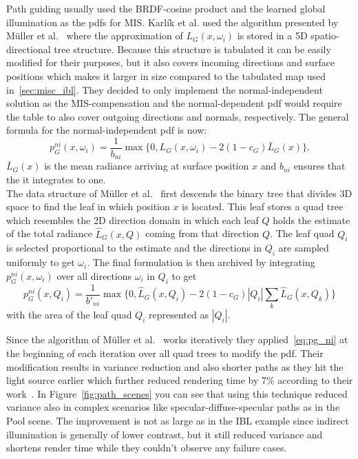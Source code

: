 Path guiding usually used the BRDF-cosine product and the learned global illumination as the pdfs for MIS.
Karl\'ik et al. used the algorithm presented by M\"uller et al.~\cite{mueller2017}
where the approximation of $ L_G(x, \omega_i) $ is stored in a 5D spatio-directional tree structure.
Because this structure is tabulated it can be easily modified for their purposes,
but it also covers incoming directions and surface positions which makes it larger in size compared to the tabulated map used in~\ref{sec:misc_ibl}.
They decided to only implement the normal-independent solution
as the MIS-compensation and the normal-dependent pdf would require the table to also cover outgoing directions and normals, respectively.
The general formula for the normal-independent pdf is now:
$$ p_G^{ni}(x, \omega_i) = \frac{1}{b_{ni}} \max \{ 0, L_G(x, \omega_i) - 2 (1 - c_G) \bar{L}_G(x) \}. $$
$ \bar{L}_G(x) $ is the mean radiance arriving at surface position $ x $ and $ b_{ni} $ ensures that the it integrates to one.\\
The data structure of M\"uller et al.~\cite{mueller2017} first descends the binary tree that divides 3D space to find the leaf in which position $ x $ is located.
This leaf stores a quad tree which resembles the 2D direction domain in which each leaf $ Q $ holds the estimate of the total radiance $ \hat{L}_G(x, Q) $ coming from that direction $ Q $.
The leaf quad $ Q_i $ is selected proportional to the estimate and the directions in $ Q_i $ are sampled uniformly to get $ \omega_i $.
The final formulation is then archived by integrating $ p_G^{ni}(x, \omega_i) $ over all directions $ \omega_i $ in $ Q_i $ to get
\begin{equation}
    \label{eq:pg_ni}
    p_G^{ni}(x, Q_i) = \frac{1}{b'_{ni}} \max \{ 0, \hat{L}_G(x, Q_i) - 2 (1 - c_G) |Q_i| \sum_k \hat{L}_G(x, Q_k) \}
\end{equation}
with the area of the leaf quad $ Q_i $ represented as $ |Q_i| $.

Since the algorithm of M\"uller et al.~\cite{mueller2017} works iteratively they applied~\ref{eq:pg_ni} at the beginning of each iteration over all quad trees to modify the pdf.
Their modification results in variance reduction and also shorter paths
as they hit the light source earlier which further reduced rendering time by 7\% according to their work~\cite[Section~9]{Karlik2019}.
In Figure~\ref{fig:path_scenes} you can see that using this technique reduced variance also in complex scenarios like specular-diffuse-specular paths as in the Pool scene.
The improvement is not as large as in the IBL example since indirect illumination is generally of lower contrast,
but it still reduced variance and shortens render time while they couldn't observe any failure cases.

